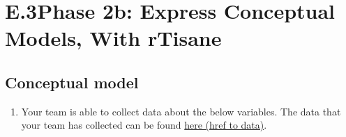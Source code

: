 \documentclass[
]{article}
\author{}
\date{\vspace{-2.5em}}
\providecommand{\tightlist}{%
  \setlength{\itemsep}{0pt}\setlength{\parskip}{0pt}}
\begin{document}
\setcounter{page}{240}

\hypertarget{conceptual-model}{%
\section{E.3\hspace{0.5cm}Phase 2b: Express Conceptual Models, With rTisane}
\subsection{Conceptual model}\label{conceptual-model}}

\begin{enumerate}
\def\labelenumi{\arabic{enumi}.}
\tightlist
\item
  Your team is able to collect data about the below variables. The data
  that your team has collected can be found
  \href{https://homes.cs.washington.edu/~emjun/income_final.csv}{here (href to data)}.
\end{enumerate}
\end{document}
